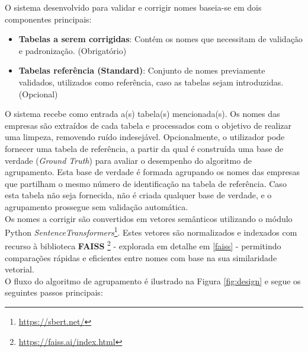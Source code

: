 \documentclass[a4paper,12pt]{article}
\begin{document}
O sistema desenvolvido para validar e corrigir nomes baseia-se em dois componentes principais:
\begin{itemize}
    \item \textbf{Tabelas a serem corrigidas}: Contém os nomes que necessitam de validação e padronização. (Obrigatório)
    \item \textbf{Tabelas referência (Standard)}: Conjunto de nomes previamente validados, utilizados como referência, caso as tabelas sejam introduzidas. (Opcional)
\end{itemize}
O sistema recebe como entrada a(s) tabela(s) mencionada(s). Os nomes das empresas são extraídos de cada tabela e processados com o objetivo de realizar uma limpeza, removendo ruído indesejável. Opcionalmente, o utilizador pode fornecer uma tabela de referência, a partir da qual é construída uma base de verdade (\textit{Ground Truth}) para avaliar o desempenho do algoritmo de agrupamento. Esta base de verdade é formada agrupando os nomes das empresas que partilham o mesmo número de identificação na tabela de referência. Caso esta tabela não seja fornecida, não é criada qualquer base de verdade, e o agrupamento prossegue sem validação automática.
\\
Os nomes a corrigir são convertidos em vetores semânticos utilizando o módulo Python \textit{SentenceTransformers}\footnote{\url{https://sbert.net/}}. Estes vetores são normalizados e indexados com recurso à biblioteca \textbf{FAISS} \footnote{\url{https://faiss.ai/index.html}} - explorada em detalhe em \ref{faiss} - permitindo comparações rápidas e eficientes entre nomes com base na sua similaridade vetorial.
\\
O fluxo do algoritmo de agrupamento é ilustrado na Figura \ref{fig:design} e segue os seguintes passos principais:
\end{document}
